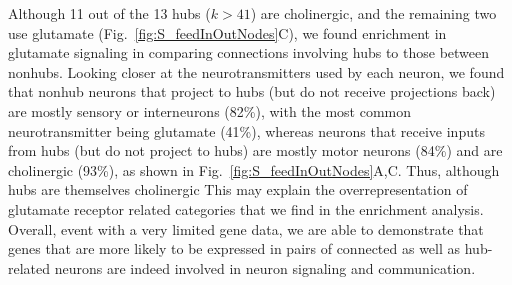\documentclass[10pt,letterpaper]{article}
\newlength\savedwidth
\newcommand\thickhline{\noalign{\global\savedwidth\arrayrulewidth\global\arrayrulewidth 2pt}%
\hline
\noalign{\global\arrayrulewidth\savedwidth}}
\begin{document}
Although 11 out of the 13 hubs ($k > 41$) are cholinergic, and the remaining two use glutamate (Fig.~\ref{fig:S_feedInOutNodes}C), we found enrichment in glutamate signaling in comparing connections involving hubs to those between nonhubs.
Looking closer at the neurotransmitters used by each neuron, we found that nonhub neurons that project to hubs (but do not receive projections back) are mostly sensory or interneurons (82\%), with the most common neurotransmitter being glutamate (41\%), whereas neurons that receive inputs from hubs (but do not project to hubs) are mostly motor neurons (84\%) and are cholinergic (93\%), as shown in Fig.~\ref{fig:S_feedInOutNodes}A,C.
Thus, although hubs are themselves cholinergic
This may explain the overrepresentation of glutamate receptor related categories that we find in the enrichment analysis.
Overall, event with a very limited gene data, we are able to demonstrate that genes that are more likely to be expressed in pairs of connected as well as hub-related neurons are indeed involved in neuron signaling and communication. 



\end{document}
